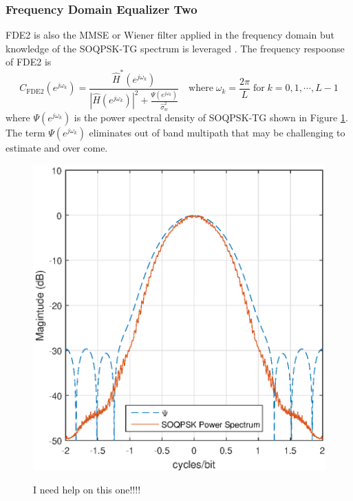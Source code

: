 \subsubsection{Frequency Domain Equalizer Two}
FDE2 is also the MMSE or Wiener filter applied in the frequency domain but knowledge of the SOQPSK-TG spectrum is leveraged \cite[eq. (12)]{williams2013linear}.
The frequency respoonse of FDE2 is
\begin{equation}
C_\text{FDE2}(e^{j\omega_k}) = \frac{\hat{H}^\ast(e^{j\omega_k})}  {|\hat{H}(e^{j\omega_k})|^2  +  \frac{\Psi(e^{j\omega_k})}{\hat{\sigma}^2_w}} \quad
\text{where} \;
\omega_k = \frac{2\pi}{L} \;
\text{for} \;
k=0,1,\cdots,L-1
\label{eq:FDE2}
\end{equation}
where $\Psi(e^{j\omega_k})$ is the power spectral density of SOQPSK-TG shown in Figure \ref{fig:SOQPSK_spectrum}.
The term $\Psi(e^{j\omega_k})$ eliminates out of band multipath that may be challenging to estimate and over come.
\begin{figure}
	\centering\includegraphics[width=5in]{figures/eq_equations/FDE2_spectrum_PSI.eps}
	\label{fig:SOQPSK_spectrum}
	\caption{I need help on this one!!!! }
\end{figure}
